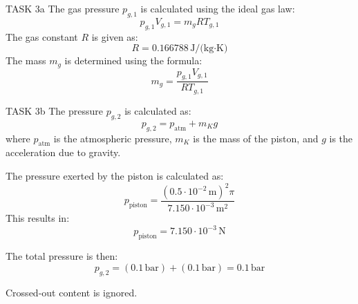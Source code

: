 TASK 3a  
The gas pressure \( p_{g,1} \) is calculated using the ideal gas law:  
\[
p_{g,1} V_{g,1} = m_g R T_{g,1}
\]  
The gas constant \( R \) is given as:  
\[
R = 0.166788 \, \text{J/(kg·K)}
\]  
The mass \( m_g \) is determined using the formula:  
\[
m_g = \frac{p_{g,1} V_{g,1}}{R T_{g,1}}
\]  

TASK 3b  
The pressure \( p_{g,2} \) is calculated as:  
\[
p_{g,2} = p_{\text{atm}} + m_K g
\]  
where \( p_{\text{atm}} \) is the atmospheric pressure, \( m_K \) is the mass of the piston, and \( g \) is the acceleration due to gravity.  

The pressure exerted by the piston is calculated as:  
\[
p_{\text{piston}} = \frac{(0.5 \cdot 10^{-2} \, \text{m})^2 \pi}{7.150 \cdot 10^{-3} \, \text{m}^2}
\]  
This results in:  
\[
p_{\text{piston}} = 7.150 \cdot 10^{-3} \, \text{N}
\]  

The total pressure is then:  
\[
p_{g,2} = (0.1 \, \text{bar}) + (0.1 \, \text{bar}) = 0.1 \, \text{bar}
\]  

Crossed-out content is ignored.